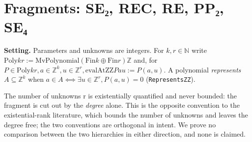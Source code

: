 \section{Fragments: SE₂, REC, RE, PP₂, SE₄}\label{sec:1}
\textbf{Setting.} Parameters and unknowns are integers. For $k, r ∈ ℕ$ write $\mathrm{Poly} k r := \mathrm{MvPolynomial} (\mathrm{Fin} k ⊕ \mathrm{Fin} r) ℤ$ and, for $P ∈ \mathrm{Poly} k r, a ∈ ℤ^{k}, u ∈ ℤ^{r}, \mathrm{evalAtZZ} P a u := P(a, u)$. A polynomial \emph{represents} $A ⊆ ℤ^{k}$ when $a ∈ A ⟺ ∃ u ∈ ℤ^{r}, P(a,u) = 0$ (\texttt{RepresentsZZ}).

The number of unknowns r is existentially quantified and never bounded: the fragment is cut out by the \emph{degree} alone. This is the opposite convention to the existential-rank literature, which bounds the number of unknowns and leaves the degree free; the two conventions are orthogonal in intent. We prove no comparison between the two hierarchies in either direction, and none is claimed.

